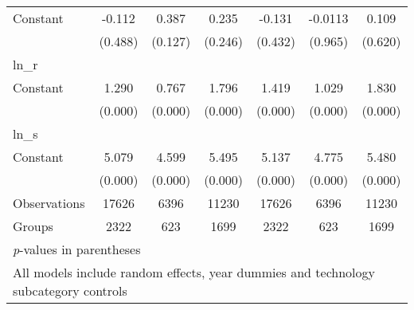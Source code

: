 \begin{sidewaystable}[htbp]
\begin{tabular}{l*{6}{c}}
Constant        &   -0.112&    0.387&    0.235&   -0.131&  -0.0113&    0.109\\
                &  (0.488)&  (0.127)&  (0.246)&  (0.432)&  (0.965)&  (0.620)\\
\hline
ln\_r            &         &         &         &         &         &         \\
Constant        &    1.290&    0.767&    1.796&    1.419&    1.029&    1.830\\
                &  (0.000)&  (0.000)&  (0.000)&  (0.000)&  (0.000)&  (0.000)\\
\hline
ln\_s            &         &         &         &         &         &         \\
Constant        &    5.079&    4.599&    5.495&    5.137&    4.775&    5.480\\
                &  (0.000)&  (0.000)&  (0.000)&  (0.000)&  (0.000)&  (0.000)\\
\hline
Observations    &    17626&     6396&    11230&    17626&     6396&    11230\\
Groups          &     2322&      623&     1699&     2322&      623&     1699\\
\hline\hline
\multicolumn{7}{l}{\footnotesize \textit{p}-values in parentheses}\\
\multicolumn{7}{l}{\footnotesize All models include random effects, year dummies and technology subcategory controls}\\
\end{tabular}
\end{sidewaystable}
